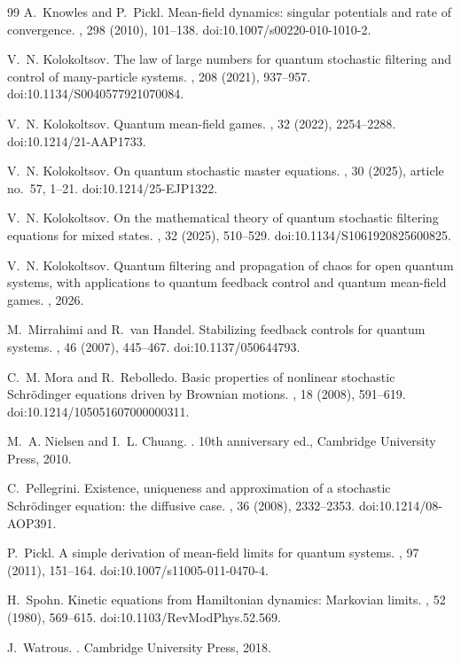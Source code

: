 \documentclass[10pt,a4paper,reqno]{amsart}
\numberwithin{equation}{section}
\theoremstyle{plain}
\theoremstyle{definition}
\theoremstyle{remark}
\newcommand{\1}{\mathbf 1}
\begin{document}
\begin{thebibliography}{99}
A.~Knowles and P.~Pickl.
\newblock Mean-field dynamics: singular potentials and rate of convergence.
, 298 (2010), 101--138.
\newblock doi:10.1007/s00220-010-1010-2.

V.~N. Kolokoltsov.
\newblock The law of large numbers for quantum stochastic filtering and
control of many-particle systems.
, 208 (2021), 937--957.
\newblock doi:10.1134/S0040577921070084.

V.~N. Kolokoltsov.
\newblock Quantum mean-field games.
, 32 (2022), 2254--2288.
\newblock doi:10.1214/21-AAP1733.

V.~N. Kolokoltsov.
\newblock On quantum stochastic master equations.
, 30 (2025), article no.~57, 1--21.
\newblock doi:10.1214/25-EJP1322.

V.~N. Kolokoltsov.
\newblock On the mathematical theory of quantum stochastic filtering equations
for mixed states.
, 32 (2025), 510--529.
\newblock doi:10.1134/S1061920825600825.

V.~N. Kolokoltsov.
\newblock Quantum filtering and propagation of chaos for open quantum systems,
with applications to quantum feedback control and quantum mean-field games.
,  2026.

M.~Mirrahimi and R.~van Handel.
\newblock Stabilizing feedback controls for quantum systems.
, 46 (2007), 445--467.
\newblock doi:10.1137/050644793.

C.~M. Mora and R.~Rebolledo.
\newblock Basic properties of nonlinear stochastic Schr\"odinger equations
driven by Brownian motions.
, 18 (2008), 591--619.
\newblock doi:10.1214/105051607000000311.

M.~A. Nielsen and I.~L. Chuang.
.
\newblock 10th anniversary ed., Cambridge University Press, 2010.

C.~Pellegrini.
\newblock Existence, uniqueness and approximation of a stochastic
Schr\"odinger equation: the diffusive case.
, 36 (2008), 2332--2353.
\newblock doi:10.1214/08-AOP391.

P.~Pickl.
\newblock A simple derivation of mean-field limits for quantum systems.
, 97 (2011), 151--164.
\newblock doi:10.1007/s11005-011-0470-4.

H.~Spohn.
\newblock Kinetic equations from Hamiltonian dynamics: Markovian limits.
, 52 (1980), 569--615.
\newblock doi:10.1103/RevModPhys.52.569.

J.~Watrous.
.
\newblock Cambridge University Press, 2018.

\end{thebibliography}
\end{document}
